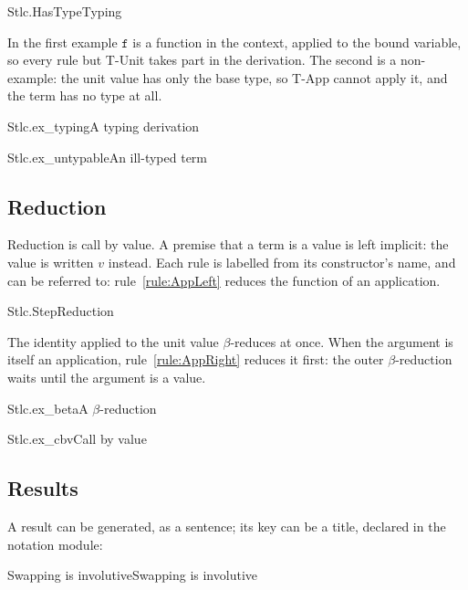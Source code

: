 \documentclass{article}
\newcommand\val{v}
\begin{document}
\begin{leanrules}{Stlc.HasType}{Typing}
\end{leanrules}

In the first example $\mathtt{f}$ is a function in the context, applied to the bound
variable, so every rule but T-Unit takes part in the derivation. The second
is a non-example: the unit value has only the base type, so T-App cannot
apply it, and the term has no type at all.

\begin{leanexample}{Stlc.ex_typing}{A typing derivation}
\end{leanexample}

\begin{leanexample}{Stlc.ex_untypable}{An ill-typed term}
\end{leanexample}

\subsection{Reduction}

Reduction is call by value. A premise that a term is a value is left
implicit: the value is written $\val$ instead. Each rule is labelled from its
constructor's name, and can be referred to: rule~\ref{rule:AppLeft}
reduces the function of an application.

\begin{leanrules}{Stlc.Step}{Reduction}
\end{leanrules}

The identity applied to the unit value $\beta$-reduces at once. When the
argument is itself an application, rule~\ref{rule:AppRight} reduces it first:
the outer $\beta$-reduction waits until the argument is a value.

\begin{leanexample}{Stlc.ex_beta}{A $\beta$-reduction}
\end{leanexample}

\begin{leanexample}{Stlc.ex_cbv}{Call by value}
\end{leanexample}

\subsection{Results}

A result can be generated, as a sentence; its key can be a title, declared
in the notation module:

\begin{leantheorem}{Swapping is involutive}{Swapping is involutive}
\end{leantheorem}
\end{document}
